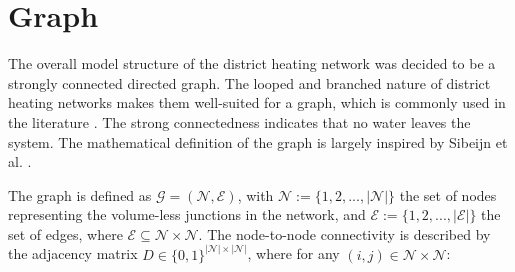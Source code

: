 \section{Graph}\label{sec::Graph}

The overall model structure of the district heating network was decided to be a strongly connected directed graph. The looped and branched nature of district heating networks makes them well-suited for a graph, which is commonly used in the literature \cite{sibeijn2025economic, Krug2020,OPPELT2016336,Simonssongraph}. The strong connectedness indicates that no water leaves the system. The mathematical definition of the graph is largely inspired by Sibeijn et al. \cite{sibeijn2025economic}.

The graph is defined as $\mathcal{G}=(\mathcal{N}, 
\mathcal{E})$, with $\mathcal{N} := \{1,2,...,|\mathcal{N}|\}$ the set of nodes representing the volume-less junctions in the network, and 
$\mathcal{E} := \{1,2,...,|\mathcal{E}|\}$ the set of edges, where 
$\mathcal{E} \subseteq \mathcal{N} \times \mathcal{N}$. The node-to-node 
connectivity is described by the adjacency matrix $D \in \{0,1\}^{|\mathcal{N}|\times |\mathcal{N}|}$, where for any $(i,j) \in \mathcal{N} \times \mathcal{N}$:

